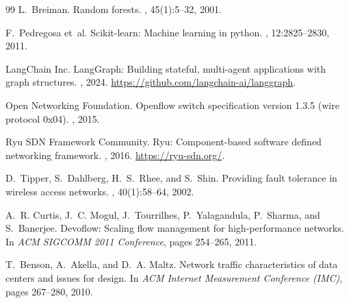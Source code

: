 \documentclass[11pt,a4paper,oneside]{report}
\begin{document}
\begin{thebibliography}{99}
L.~Breiman.
\newblock Random forests.
, 45(1):5--32, 2001.

F.~Pedregosa et~al.
\newblock Scikit-learn: Machine learning in python.
, 12:2825--2830, 2011.

LangChain Inc.
\newblock LangGraph: Building stateful, multi-agent applications with graph structures.
, 2024. \url{https://github.com/langchain-ai/langgraph}.

Open Networking Foundation.
\newblock Openflow switch specification version 1.3.5 (wire protocol 0x04).
, 2015.

Ryu SDN Framework Community.
\newblock Ryu: Component-based software defined networking framework.
, 2016. \url{https://ryu-sdn.org/}.

D.~Tipper, S.~Dahlberg, H.~S.~Rhee, and S.~Shin.
\newblock Providing fault tolerance in wireless access networks.
, 40(1):58--64, 2002.

A.~R. Curtis, J.~C. Mogul, J.~Tourrilhes, P.~Yalagandula, P.~Sharma, and S.~Banerjee.
\newblock Devoflow: Scaling flow management for high-performance networks.
\newblock In {\em ACM SIGCOMM 2011 Conference}, pages 254--265, 2011.

T.~Benson, A.~Akella, and D.~A. Maltz.
\newblock Network traffic characteristics of data centers and issues for design.
\newblock In {\em ACM Internet Measurement Conference (IMC)}, pages 267--280, 2010.

\end{thebibliography}
\end{document}
